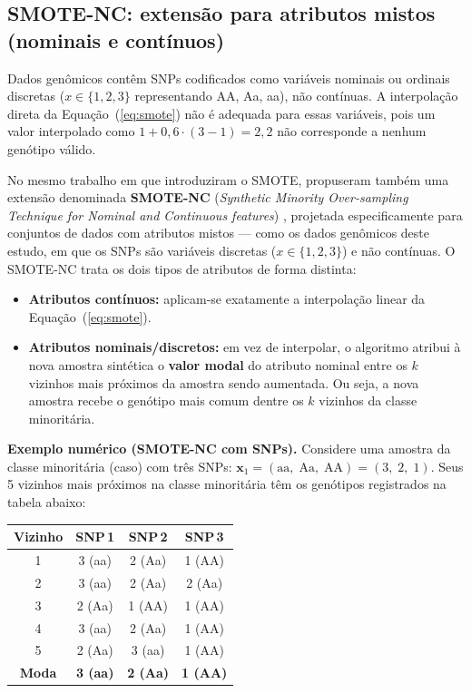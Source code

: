 \documentclass[
    12pt,
    a4paper,
    oneside,
    english,
    french,
    spanish,
    brazil
    ]{abntex2}
\renewcommand{\arraystretch}{1.3}
\newcommand{\novo}[1]{\textcolor{corNova}{#1}}
\begin{document}
\subsection*{SMOTE-NC: extensão para atributos mistos (nominais e contínuos)}

\novo{Dados genômicos contêm SNPs codificados como variáveis nominais ou ordinais discretas ($x \in \{1, 2, 3\}$ representando AA, Aa, aa), não contínuas. A interpolação direta da Equação~(\ref{eq:smote}) não é adequada para essas variáveis, pois um valor interpolado como $1 + 0{,}6 \cdot (3 - 1) = 2{,}2$ não corresponde a nenhum genótipo válido.}

\novo{No mesmo trabalho em que introduziram o SMOTE, \citeonline{chawla2002smote} propuseram também uma extensão denominada \textbf{SMOTE-NC} (\textit{Synthetic Minority Over-sampling Technique for Nominal and Continuous features}) \cite{chawla2002smote}, projetada especificamente para conjuntos de dados com atributos mistos --- como os dados genômicos deste estudo, em que os SNPs são variáveis discretas ($x \in \{1, 2, 3\}$) e não contínuas. O SMOTE-NC trata os dois tipos de atributos de forma distinta:}

\begin{itemize}
  \item \novo{\textbf{Atributos contínuos:} aplicam-se exatamente a interpolação linear da Equação~(\ref{eq:smote}).}
  \item \novo{\textbf{Atributos nominais/discretos:} em vez de interpolar, o algoritmo atribui à nova amostra sintética o \textbf{valor modal} do atributo nominal entre os $k$ vizinhos mais próximos da amostra sendo aumentada. Ou seja, a nova amostra recebe o genótipo mais comum dentre os $k$ vizinhos da classe minoritária.}
\end{itemize}

\novo{\textbf{Exemplo numérico (SMOTE-NC com SNPs).} Considere uma amostra da classe minoritária (caso) com três SNPs: $\mathbf{x}_1 = (\text{aa},\; \text{Aa},\; \text{AA}) = (3,\; 2,\; 1)$. Seus 5 vizinhos mais próximos na classe minoritária têm os genótipos registrados na tabela abaixo:}

\begin{center}
\small
\renewcommand{\arraystretch}{1.3}
\begin{tabular}{cccc}
\hline
\textbf{Vizinho} & \textbf{SNP\,1} & \textbf{SNP\,2} & \textbf{SNP\,3} \\
\hline
1 & 3 (aa) & 2 (Aa) & 1 (AA) \\
2 & 3 (aa) & 2 (Aa) & 2 (Aa) \\
3 & 2 (Aa) & 1 (AA) & 1 (AA) \\
4 & 3 (aa) & 2 (Aa) & 1 (AA) \\
5 & 2 (Aa) & 3 (aa) & 1 (AA) \\
\hline
\textbf{Moda} & \textbf{3 (aa)} & \textbf{2 (Aa)} & \textbf{1 (AA)} \\
\hline
\end{tabular}
\end{center}
\end{document}
